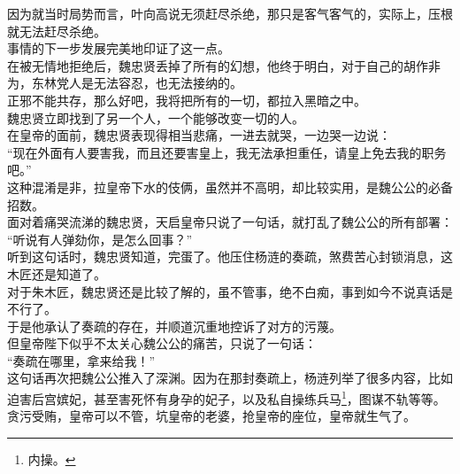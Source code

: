 \begin{multicols}{\theparacolNo}
因为就当时局势而言，叶向高说无须赶尽杀绝，那只是客气客气的，实际上，压根就无法赶尽杀绝。\\

事情的下一步发展完美地印证了这一点。\\

在被无情地拒绝后，魏忠贤丢掉了所有的幻想，他终于明白，对于自己的胡作非为，东林党人是无法容忍，也无法接纳的。\\

正邪不能共存，那么好吧，我将把所有的一切，都拉入黑暗之中。\\

魏忠贤立即找到了另一个人，一个能够改变一切的人。\\

在皇帝的面前，魏忠贤表现得相当悲痛，一进去就哭，一边哭一边说：\\

“现在外面有人要害我，而且还要害皇上，我无法承担重任，请皇上免去我的职务吧。”\\

这种混淆是非，拉皇帝下水的伎俩，虽然并不高明，却比较实用，是魏公公的必备招数。\\

面对着痛哭流涕的魏忠贤，天启皇帝只说了一句话，就打乱了魏公公的所有部署：\\

“听说有人弹劾你，是怎么回事？”\\

听到这句话时，魏忠贤知道，完蛋了。他压住杨涟的奏疏，煞费苦心封锁消息，这木匠还是知道了。\\

对于朱木匠，魏忠贤还是比较了解的，虽不管事，绝不白痴，事到如今不说真话是不行了。\\

于是他承认了奏疏的存在，并顺道沉重地控诉了对方的污蔑。\\

但皇帝陛下似乎不太关心魏公公的痛苦，只说了一句话：\\

“奏疏在哪里，拿来给我！”\\

这句话再次把魏公公推入了深渊。因为在那封奏疏上，杨涟列举了很多内容，比如迫害后宫嫔妃，甚至害死怀有身孕的妃子，以及私自操练兵马\footnote{内操。}，图谋不轨等等。\\

贪污受贿，皇帝可以不管，坑皇帝的老婆，抢皇帝的座位，皇帝就生气了。\\


\end{multicols}
